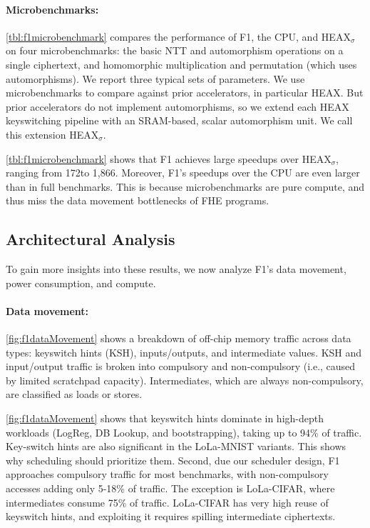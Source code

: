 \paragraph{Microbenchmarks:}
\autoref{tbl:f1microbenchmark} compares the performance of F1, the CPU, and
HEAX$_\sigma$ on four microbenchmarks: the basic NTT and automorphism
operations on a single ciphertext, and homomorphic multiplication and
permutation (which uses automorphisms). We report three typical sets of
parameters. We use microbenchmarks to compare against prior accelerators, in
particular HEAX. But prior accelerators do not implement automorphisms, so we
extend each HEAX keyswitching pipeline with an SRAM-based, scalar automorphism
unit. We call this extension HEAX$_\sigma$.

\autoref{tbl:f1microbenchmark} shows that
F1 achieves large speedups over HEAX$_\sigma$, ranging from 172\x to 1,866\x.
Moreover, F1's speedups over the CPU are even larger than in full benchmarks.
This is because microbenchmarks are pure compute, and thus miss the data
movement bottlenecks of FHE programs.

\subsection{Architectural Analysis}

To gain more insights into these results, we now analyze F1's data movement,
power consumption, and compute.

\paragraph{Data movement:}
\autoref{fig:f1dataMovement} shows a breakdown of off-chip memory traffic
across data types: keyswitch hints (KSH), inputs/outputs, and intermediate
values. KSH and input/output traffic is broken into compulsory and
non-compulsory (i.e., caused by limited scratchpad capacity). Intermediates,
which are always non-compulsory, are classified as loads or stores.

\autoref{fig:f1dataMovement} shows that keyswitch hints dominate in high-depth
workloads (LogReg, DB Lookup, and bootstrapping), taking up to 94\% of traffic.
Key-switch hints are also significant in the LoLa-MNIST variants. This shows
why scheduling should prioritize them. Second, due our scheduler design, F1
approaches compulsory traffic for most benchmarks, with non\hyp{}compulsory
accesses adding only 5-18\% of traffic. The exception is LoLa-CIFAR, where
intermediates consume 75\% of traffic. LoLa-CIFAR has very high reuse of
keyswitch hints, and exploiting it requires spilling intermediate ciphertexts.

